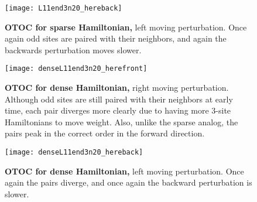 \begin{figure}
	\centering
	\texttt{[image: L11end3n20\_hereback]}
	\caption{\textbf{OTOC for sparse Hamiltonian,} left moving perturbation. Once again odd sites are paired with their neighbors, and again the backwards perturbation moves slower.}
	\label{fig:L11end3n20_hereback}
\end{figure}

\begin{figure}
	\centering
	\texttt{[image: denseL11end3n20\_herefront]}
	\caption{\textbf{OTOC for dense Hamiltonian,} right moving perturbation. Although odd sites are still paired with their neighbors at early time, each pair diverges more clearly due to having more 3-site Hamiltonians to move weight. Also, unlike the sparse analog, the pairs peak in the correct order in the forward direction.}
	\label{fig:denseL11end3n20_herefront}
\end{figure}

\begin{figure}
	\centering
	\texttt{[image: denseL11end3n20\_hereback]}
	\caption{\textbf{OTOC for dense Hamiltonian,} left moving perturbation. Once again the pairs diverge, and once again the backward perturbation is slower.}
	\label{fig:denseL11end3n20_hereback}
\end{figure}

